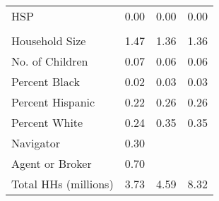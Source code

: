 \begin{tabular}{lrrr}
\hspace{1em}HSP & 0.00 & 0.00 & 0.00\\
\addlinespace[0.3em]
\multicolumn{4}{l}{\textbf{Household Characteristics}}\\
\hspace{1em}Household Size & 1.47 & 1.36 & 1.36\\
\hspace{1em}No. of Children & 0.07 & 0.06 & 0.06\\
\hspace{1em}Percent Black & 0.02 & 0.03 & 0.03\\
\hspace{1em}Percent Hispanic & 0.22 & 0.26 & 0.26\\
\hspace{1em}Percent White & 0.24 & 0.35 & 0.35\\
\hspace{1em}Navigator & 0.30 &  & \\
\hspace{1em}Agent or Broker & 0.70 &  & \\
\hspace{1em}Total HHs (millions) & 3.73 & 4.59 & 8.32\\
\bottomrule
\end{tabular}
